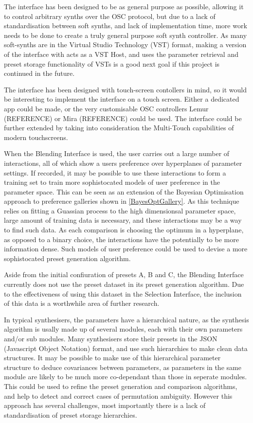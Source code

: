 \documentclass[11pt, oneside]{report}   	%
\begin{document}
The interface has been designed to be as general purpose as possible, allowing it to control arbitrary synths over the OSC protocol, but due to a lack of standardisation between soft synths, and lack of implementation time, more work needs to be done to create a truly general purpose soft synth controller. As many soft-synths are in the Virtual Studio Technology (VST) format, making a version of the interface with acts as a VST Host, and uses the parameter retrieval and preset storage functionality of VSTs is a good next goal if this project is continued in the future.

The interface has been designed with touch-screen contollers in mind, so it would be interesting to implement the interface on a touch screen. Either a dedicated app could be made, or the very customisable OSC controllers Lemur (REFERENCE) or Mira (REFERENCE) could be used. The interface could be further extended by taking into consideration the Multi-Touch capabilities of modern touchscreens.

When the Blending Interface is used, the user carries out a large number of interactions, all of which show a users preference over hyperplanes of parameter settings. If recorded, it may be possible to use these interactions to form a training set to train more sophistocated models of user preference in the parameter space. This can be seen as an extension of the Bayesian Optimisation approach to preference galleries shown in \ref{BayesOptGallery}. As this technique relies on fitting a Guassian process to the high dimensionsal parameter space, large amount of training data is necessary, and these interactions may be a way to find such data. As each comparison is choosing the optimum in a hyperplane, as opposed to a binary choice, the interactions have the potentially to be more information dense. Such models of user preference could be used to devise a more sophistocated preset generation algorithm.

Aside from the initial confiuration of presets A, B and C, the Blending Interface currently does not use the preset dataset in its preset generation algorithm. Due to the effectiveness of using this dataset in the Selection Interface, the inclusion of this data is a worthwhile area of further research.

In typical synthesisers, the parameters have a hierarchical nature, as the synthesis algorithm is usally made up of several modules, each with their own parameters and/or sub modules. Many synthesisers store their presets in the JSON (Javascript Object Notation) format, and use such hierarchies to make clean data structures. It may be possible to make use of this hierarchical parameter structure to deduce covariances between parameters, as parameters in the same module are likely to be much more co-dependant than those in seperate modules. This could be used to refine the preset generation and comparison algorithms, and help to detect and correct cases of permutation ambiguity. However this approach has several challenges, most importantly there is a lack of standardisation of preset storage hierarchies.
\end{document}
